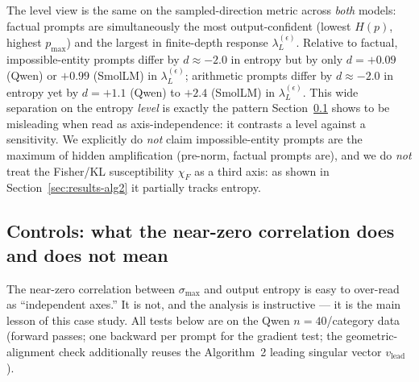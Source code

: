 \documentclass{article}
\begin{document}
The level view is the same on the sampled-direction metric across \emph{both} models: factual
prompts are simultaneously the most output-confident (lowest $H(p)$, highest $p_{\max}$) and the
largest in finite-depth response $\lambda_L^{(\epsilon)}$. Relative to factual, impossible-entity
prompts differ by $d\approx-2.0$ in entropy but by only $d=+0.09$ (Qwen) or $+0.99$ (SmolLM) in
$\lambda_L^{(\epsilon)}$; arithmetic prompts differ by $d\approx-2.0$ in entropy yet by $d=+1.1$
(Qwen) to $+2.4$ (SmolLM) in $\lambda_L^{(\epsilon)}$. This wide separation on the entropy
\emph{level} is exactly the pattern Section~\ref{sec:controls} shows to be misleading when read as
axis-independence: it contrasts a level against a sensitivity. We explicitly do \emph{not} claim
impossible-entity prompts are the maximum of hidden amplification (pre-norm, factual prompts are),
and we do \emph{not} treat the Fisher/KL susceptibility $\chi_F$ as a third axis: as shown in
Section~\ref{sec:results-alg2} it partially tracks entropy.

\subsection{Controls: what the near-zero correlation does and does not mean}
\label{sec:controls}
The near-zero correlation between $\sigma_{\max}$ and output entropy is easy to over-read as
``independent axes.'' It is not, and the analysis is instructive --- it is the main lesson of
this case study. All tests below are on the Qwen $n=40$/category data (forward passes; one backward
per prompt for the gradient test; the geometric-alignment check additionally reuses the Algorithm~2
leading singular vector $v_{\mathrm{lead}}$).
\end{document}
